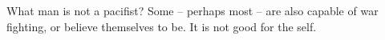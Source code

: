 

What man is not a pacifist?  Some -- perhaps most -- are also capable
of war fighting, or believe themselves to be.  It is not good for the
self.

\bye
